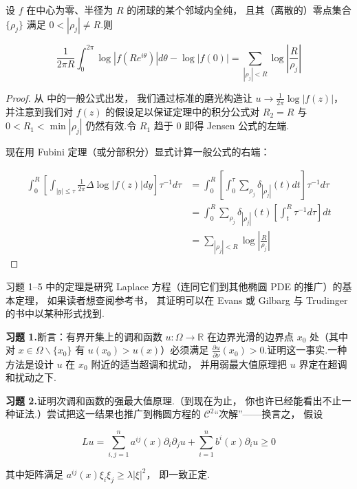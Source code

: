 \begin{proposition}[Jensen 公式]\label{prop:c4-2.7}
设 $f$ 在中心为零、半径为 $R$ 的闭球的某个邻域内全纯， 且其（离散的）零点集合 $\{\rho_{j}\}$ 满足 $0 < |\rho_{j}| \neq R$.则

\[
\frac{1}{2\pi R}\int_{0}^{2\pi}\log|f(Re^{i\theta})|d\theta - \log|f(0)| = \sum_{|\rho_{j}|<R}\log\left|\frac{R}{\rho_{j}}\right|
\]
\end{proposition}

\begin{proof}
从 中的一般公式出发， 我们通过标准的磨光构造让 $u \to \frac{1}{2\pi}\log|f(z)|$， 并注意到我们对 $f(z)$ 的假设足以保证定理中的积分公式对 $R_{2} = R$ 与 $0 < R_{1} < \min|\rho_{j}|$ 仍然有效.令 $R_{1}$ 趋于 0 即得 Jensen 公式的左端.

现在用 Fubini 定理（或分部积分）显式计算一般公式的右端：

\[
\begin{aligned}
\int_{0}^{R}\left[\int_{|y|\leq\tau}\frac{1}{2\pi}\Delta\log|f(z)|dy\right]\tau^{-1}d\tau &= \int_{0}^{R}\left[\int_{0}^{\tau}\sum_{\rho_{j}}\delta_{|\rho_{j}|}(t)dt\right]\tau^{-1}d\tau \\
&= \int_{0}^{R}\sum_{\rho_{j}}\delta_{|\rho_{j}|}(t)\left[\int_{t}^{R}\tau^{-1}d\tau\right]dt \\
&= \sum_{|\rho_{j}|<R}\log\left|\frac{R}{\rho_{j}}\right|
\end{aligned}
\]
\end{proof}

习题 1--5 中的定理是研究 Laplace 方程（连同它们到其他椭圆 PDE 的推广）的基本定理， 如果读者想查阅参考书， 其证明可以在 Evans 或 Gilbarg 与 Trudinger 的书中以某种形式找到.

\noindent\textbf{习题 1.}\quad [Hopf 引理] 断言：有界开集上的调和函数 $u : \Omega \to \mathbb{R}$ 在边界光滑的边界点 $x_{0}$ 处（其中对 $x \in \Omega\backslash\{x_{0}\}$ 有 $u(x_{0}) > u(x)$）必须满足 $\frac{\partial u}{\partial\nu}(x_{0}) > 0$.证明这一事实.一种方法是设计 $u$ 在 $x_{0}$ 附近的适当超调和扰动， 并用弱最大值原理把 $u$ 界定在超调和扰动之下.

\noindent\textbf{习题 2.}\quad 证明次调和函数的强最大值原理.（到现在为止， 你也许已经能看出不止一种证法.）尝试把这一结果也推广到椭圆方程的 $\mathcal{C}^{2}$``次解''——换言之， 假设

\[
Lu = \sum_{i, j=1}^{n}a^{ij}(x)\partial_{i}\partial_{j}u + \sum_{i=1}^{n}b^{i}(x)\partial_{i}u \geq 0
\]

其中矩阵满足 $a^{ij}(x)\xi_{i}\xi_{j} \geq \lambda|\xi|^{2}$， 即一致正定.

